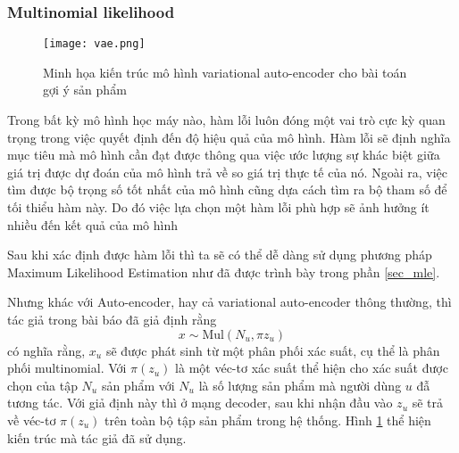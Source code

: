     \subsubsection{Multinomial likelihood}
    \label{mulll}
    \begin{figure}
        \centering
        \texttt{[image: vae.png]}
        \caption{Minh họa kiến trúc mô hình variational auto-encoder cho bài toán gợi ý sản phẩm}
        \label{fig_mvae}
    \end{figure}
    Trong bất kỳ mô hình học máy nào, hàm lỗi luôn đóng một vai trò cực kỳ quan trọng trong việc quyết định đến độ hiệu quả của mô hình. 
    Hàm lỗi sẽ định nghĩa mục tiêu mà mô hình cần đạt được thông qua việc ước lượng sự khác biệt giữa giá trị được dự đoán của mô hình trả về so giá trị thực tế của nó.
    Ngoài ra, việc tìm được bộ trọng số tốt nhất của mô hình cũng dựa cách tìm ra bộ tham số để tối thiểu hàm này.
    Do đó việc lựa chọn một hàm lỗi phù hợp sẽ ảnh hưởng ít nhiều đến kết quả của mô hình 

    Sau khi xác định được hàm lỗi thì ta sẽ có thể dễ dàng sử dụng phương pháp Maximum Likelihood Estimation như đã được trình bày trong phần \ref{sec_mle}.

    Nhưng khác với Auto-encoder, hay cả variational auto-encoder thông thường, thì tác giả trong bài báo \cite{mvae} đã giả định rằng 
    \begin{equation}
        \label{asumpt_xu}
        x \sim \text{Mul}(N_u,\pi{z_u})
    \end{equation}
    có nghĩa rằng, $x_u$ sẽ được phát sinh từ một phân phối xác suất, cụ thể là phân phối multinomial.
    Với $\pi(z_u)$ là một véc-tơ xác suất thể hiện cho xác suất được chọn của tập $N_u$ sản phẩm  với $N_u$ là số lượng sản phẩm mà người dùng $u$ đẫ tương tác. 
    Với giả định này thì ở mạng decoder, sau khi nhận đầu vào $z_u$ sẽ trả về véc-tơ $\pi(z_u)$ trên toàn bộ tập sản phẩm trong hệ thống. 
    Hình \ref{fig_mvae} thể hiện kiến trúc mà tác giả đã sử dụng. 

